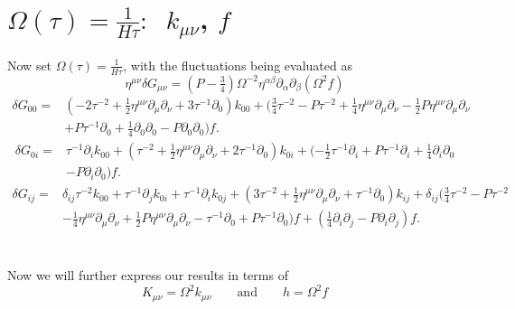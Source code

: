 \documentclass[10pt,letterpaper]{article}
\begin{document}
\section*{$\Omega(\tau)=\tfrac{1}{H\tau}:$\  $k_{\mu\nu}$, $f$}
Now set $\Omega(\tau) = \frac{1}{H\tau}$, with the fluctuations being evaluated as
\begin{equation}
\eta^{\mu\nu}\delta G_{\mu\nu} =(P-\tfrac34) \Omega^{-2}\eta^{\alpha\beta}\partial_\alpha\partial_\beta (\Omega^{2} f)
\end{equation}
\begin{align}
\delta G_{00}={}&(-2 \tau^{-2}
 + \tfrac{1}{2} \eta^{\mu \nu} \partial_{\mu} \partial_{\nu}
 + 3 \tau^{-1} \partial_{0}) k_{00}
 + (\tfrac{3}{4} \tau^{-2}
 -  P \tau^{-2}
 + \tfrac{1}{4} \eta^{\mu \nu} \partial_{\mu} \partial_{\nu}
 -  \tfrac{1}{2} P \eta^{\mu \nu} \partial_{\mu} \partial_{\nu}\nonumber\\
& + P \tau^{-1} \partial_{0}
 + \tfrac{1}{4} \partial_{0} \partial_{0}
 -  P \partial_{0} \partial_{0}) f.
\end{align}
\begin{align}
\delta G_{0i}={}&\tau^{-1} \partial_{i} k_{00}
 + (\tau^{-2}
 + \tfrac{1}{2} \eta^{\mu \nu} \partial_{\mu} \partial_{\nu}
 + 2 \tau^{-1} \partial_{0}) k_{0i}
 + (- \tfrac{1}{2} \tau^{-1} \partial_{i}
 + P \tau^{-1} \partial_{i}
 + \tfrac{1}{4} \partial_{i} \partial_{0}\nonumber\\
& -  P \partial_{i} \partial_{0}) f.
\end{align}
\begin{align}
\delta G_{ij}={}&\delta_{ij}\tau^{-2} k_{00}
 +\tau^{-1} \partial_{j} k_{0i}
 + \tau^{-1} \partial_{i} k_{0j}
 + (3 \tau^{-2}
 + \tfrac{1}{2} \eta^{\mu \nu} \partial_{\mu} \partial_{\nu}
 + \tau^{-1} \partial_{0}) k_{ij}
 + \delta_{ij}(\tfrac{3}{4} \tau^{-2}
 -  P \tau^{-2}\nonumber\\
& -  \tfrac{1}{4} \eta^{\mu \nu} \partial_{\mu} \partial_{\nu}
 + \tfrac{1}{2} P \eta^{\mu \nu} \partial_{\mu} \partial_{\nu}
 -  \tau^{-1} \partial_{0}
 + P \tau^{-1} \partial_{0})f
 + (\tfrac{1}{4} \partial_{i} \partial_{j}
 -  P \partial_{i} \partial_{j}) f.
\end{align}
\\ \\
\noindent Now we will further express our results in terms of 
\begin{equation}
	K_{\mu\nu} = \Omega^2 k_{\mu\nu}\qquad\text{and}\qquad
	h = \Omega^2 f
\end{equation}
\end{document}

